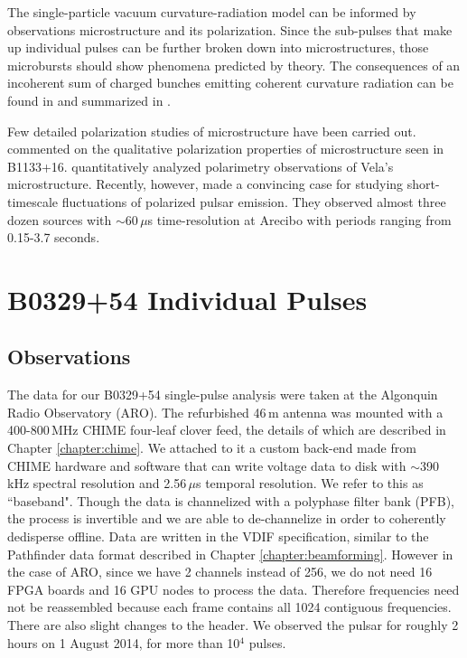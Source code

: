 The single-particle vacuum curvature-radiation model 
can be informed by observations microstructure and 
its polarization. Since the sub-pulses that make 
up individual pulses can be further broken down into 
microstructures, those microbursts should show phenomena 
predicted by theory. The consequences of 
an incoherent sum of charged bunches 
emitting coherent curvature radiation can be found 
in \citet{1990A&A...234..269G} and summarized 
in \citet{2015ApJ...806..236M}.

Few detailed polarization studies of 
microstructure have been carried out. 
\citet{1978A&A....64...27F} commented on the qualitative 
polarization properties of microstructure seen in B1133+16. 
\citet{2002MNRAS.334..523K} quantitatively analyzed polarimetry 
observations of Vela's microstructure. Recently, however, 
\citet{2015ApJ...806..236M} made a convincing case for 
studying short-timescale 
fluctuations of polarized pulsar emission. 
They observed almost three 
dozen sources with $\sim$60\,$\mu$s time-resolution at 
Arecibo with periods ranging from 0.15-3.7 seconds.




\section{B0329+54 Individual Pulses}

\subsection{Observations}

The data for our B0329+54 single-pulse analysis 
were taken at the Algonquin Radio Observatory (ARO). 
The refurbished 46\,m antenna was mounted with a 400-800\,MHz 
CHIME four-leaf clover feed, the details 
of which are described in Chapter \ref{chapter:chime}. 
We attached to it a custom back-end 
made from CHIME hardware and software that can write voltage 
data to disk with $\sim$390\,kHz spectral resolution 
and 2.56\,$\mu$s temporal resolution. We refer to this as ``baseband". 
Though the data is channelized with a polyphase filter bank (PFB),
the process is invertible and we are able to 
de-channelize in order to coherently dedisperse offline. Data are written 
in the VDIF specification, similar to the Pathfinder data format 
described in Chapter \ref{chapter:beamforming}. However in 
the case of ARO, since we have 2 channels instead of 256, we do 
not need 16 FPGA boards and 16 GPU nodes to process the data. 
Therefore frequencies need not be reassembled because 
each frame contains all 1024 contiguous frequencies. There 
are also slight changes to the header. 
We observed the pulsar for roughly 2 hours on 1 August 
2014, for more than 10$^4$ pulses. 


